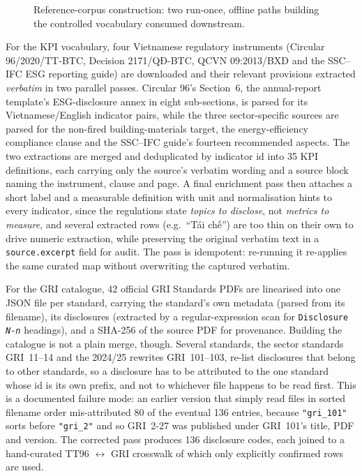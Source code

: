 \documentclass[fontsize=12pt,oneside,headings=small]{scrreprt}
\begin{document}
\begin{figure}[H]
{%
  }
  \caption[Reference-corpus construction: KPI vocabulary and GRI catalogue]{Reference-corpus
    construction: two run-once, offline paths building the controlled
    vocabulary consumed downstream.}
  \label{fig:reference-corpus}
\end{figure}

For the KPI vocabulary, four Vietnamese regulatory instruments (Circular
96/2020/TT-BTC, Decision 2171/QĐ-BTC, QCVN 09:2013/BXD and the SSC--IFC ESG
reporting guide) are downloaded and their relevant provisions extracted
\textit{verbatim} in two parallel passes. Circular 96's Section~6, the
annual-report template's ESG-disclosure annex in eight sub-sections, is
parsed for its Vietnamese/English indicator pairs, while the three
sector-specific sources are parsed for the non-fired building-materials
target, the energy-efficiency compliance clause and the SSC--IFC guide's
fourteen recommended aspects. The two extractions are merged and
deduplicated by indicator id into 35 KPI definitions, each carrying only the
source's verbatim wording and a source block naming the instrument, clause
and page. A final enrichment pass then attaches a short label and a
measurable definition with unit and normalisation hints to every indicator,
since the regulations state \textit{topics to disclose}, not
\textit{metrics to measure}, and several extracted rows (e.g.\ ``Tái chế'')
are too thin on their own to drive numeric extraction, while preserving
the original verbatim text in a \texttt{source.excerpt} field for audit. The
pass is idempotent: re-running it re-applies the same curated map without
overwriting the captured verbatim.

For the GRI catalogue, 42 official GRI Standards PDFs are
linearised into one JSON file per standard, carrying the standard's own
metadata (parsed from its filename), its disclosures (extracted by a
regular-expression scan for \texttt{Disclosure \emph{N}-\emph{n}} headings),
and a SHA-256 of the source PDF for provenance. Building the catalogue is
not a plain merge, though. Several standards, the sector standards GRI~11--14 and
the 2024/25 rewrites GRI~101--103, re-list disclosures that belong to
other standards, so a disclosure has to be attributed to the one standard whose id
is its own prefix, and not to whichever file happens to be read first. This is
a documented failure mode: an earlier version that simply read files in
sorted filename order mis-attributed 80 of the eventual 136 entries, because
\texttt{"gri\_101"} sorts before \texttt{"gri\_2"} and so GRI~2-27 was
published under GRI~101's title, PDF and version. The corrected pass
produces 136 disclosure codes, each joined to a hand-curated TT96
$\leftrightarrow$ GRI crosswalk of which only explicitly confirmed rows are
used.
\end{document}
